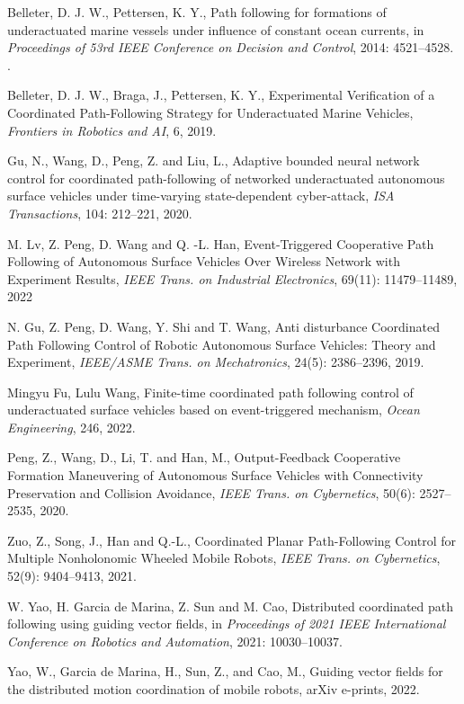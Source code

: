 \documentclass[english]{cccconf}
\begin{document}
\begin{thebibliography}{0}
	
 Belleter, D. J. W., Pettersen, K. Y., Path following for formations of underactuated marine vessels under influence of constant ocean currents, in \emph{Proceedings of 53rd IEEE Conference on Decision and Control}, 2014: 4521--4528. .

 Belleter, D. J. W., Braga, J., Pettersen, K. Y., Experimental Verification of a Coordinated Path-Following Strategy for Underactuated Marine Vehicles, \emph{Frontiers in Robotics and AI}, 6, 2019.

 Gu, N., Wang, D., Peng, Z. and Liu, L., Adaptive bounded neural network control for coordinated path-following of networked underactuated autonomous surface vehicles under time-varying state-dependent cyber-attack, \emph{ISA Transactions}, 104: 212--221, 2020.

 M. Lv, Z. Peng, D. Wang and Q. -L. Han, Event-Triggered Cooperative Path Following of Autonomous Surface Vehicles Over Wireless Network with Experiment Results, \emph{IEEE Trans. on Industrial Electronics}, 69(11): 11479--11489, 2022

 N. Gu, Z. Peng, D. Wang, Y. Shi and T. Wang, Anti disturbance Coordinated Path Following Control of Robotic Autonomous Surface Vehicles: Theory and Experiment, \emph{IEEE/ASME Trans. on Mechatronics}, 24(5): 2386--2396, 2019.

 Mingyu Fu, Lulu Wang, Finite-time coordinated path following control of underactuated surface vehicles based on event-triggered mechanism, \emph{Ocean Engineering}, 246, 2022.

 Peng, Z., Wang, D., Li, T. and Han, M., Output-Feedback Cooperative Formation Maneuvering of Autonomous Surface Vehicles with Connectivity Preservation and Collision Avoidance, \emph{IEEE Trans. on Cybernetics}, 50(6): 2527--2535, 2020.

 Zuo, Z., Song, J., Han and Q.-L., Coordinated Planar Path-Following Control for Multiple Nonholonomic Wheeled Mobile Robots, \emph{IEEE Trans. on Cybernetics}, 52(9): 9404--9413, 2021.

 W. Yao, H. Garcia de Marina, Z. Sun and M. Cao, Distributed coordinated path following using guiding vector fields, in \emph{Proceedings of 2021 IEEE International Conference on Robotics and Automation}, 2021: 10030--10037.

 Yao, W., Garcia de Marina, H., Sun, Z., and Cao, M., Guiding vector fields for the distributed motion coordination of mobile robots, arXiv e-prints, 2022.


\end{thebibliography}
\end{document}
